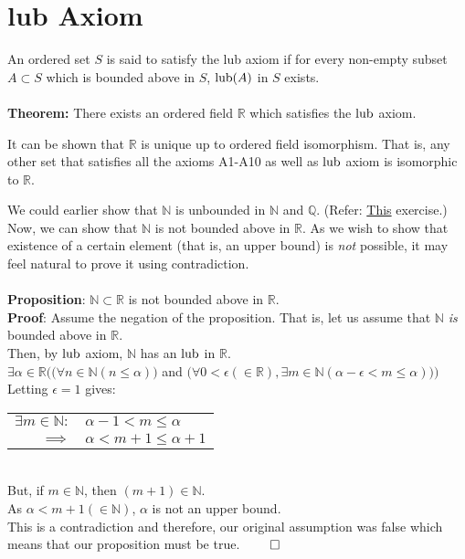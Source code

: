 \section{lub Axiom}\label{sec:lubaxiom}
An ordered set $S$ is said to satisfy the lub axiom if for every non-empty subset $A \subset S$ which is bounded above in $S$, $\operatorname{lub}(A)$ in $S$ exists.\\~\\
\textbf{Theorem:} There exists an ordered field $\mathbb{R}$ which satisfies the $\operatorname{lub}$ axiom.

\hrulefill

It can be shown that $\mathbb{R}$ is unique up to ordered field isomorphism. That is, any other set that satisfies all the axioms A1-A10 as well as $\operatorname{lub}$ axiom is isomorphic to $\mathbb{R}$.

\hrulefill

We could earlier show that $\mathbb{N}$ is unbounded in $\mathbb{N}$ and $\mathbb{Q}$. (Refer: \hyperref[ex:unboundedN]{This} exercise.)\\
Now, we can show that $\mathbb{N}$ is not bounded above in $\mathbb{R}$. As we wish to show that existence of a certain element (that is, an upper bound) is \textit{not} possible, it may feel natural to prove it using contradiction.\\~\\
\textbf{Proposition}: $\mathbb{N} \subset \mathbb{R}$ is not bounded above in $\mathbb{R}$.\\
\textbf{Proof}: Assume the negation of the proposition. That is, let us assume that $\mathbb{N}$ \textit{is} bounded above in $\mathbb{R}$.\\
Then, by $\operatorname{lub}$ axiom, $\mathbb{N}$ has an $\operatorname{lub}$ in $\mathbb{R}$.\\
$\exists \alpha \in \mathbb{R}\bigg(\big(\forall n \in \mathbb{N}(n\le \alpha)\big)$ and $ \big(\forall 0< \epsilon (\in \mathbb{R}), \exists m \in \mathbb{N}(\alpha - \epsilon < m \le \alpha) \big)\bigg)$\\
Letting $\epsilon=1$ gives:
\begin{tabular}[t]{r l}
    $\exists m\in\mathbb{N}:$ & $\alpha - 1 < m \le \alpha$\\ 
    $\implies$ & $\alpha < m+1\le \alpha + 1$
\end{tabular}\\
But, if $m\in\mathbb{N}$, then $(m+1) \in \mathbb{N}$.\\
As $\alpha < m+1 (\in \mathbb{N})$, $\alpha$ is not an upper bound.\\
This is a contradiction and therefore, our original assumption was false which means that our proposition must be true. \hfill $\qed$\\~\\

